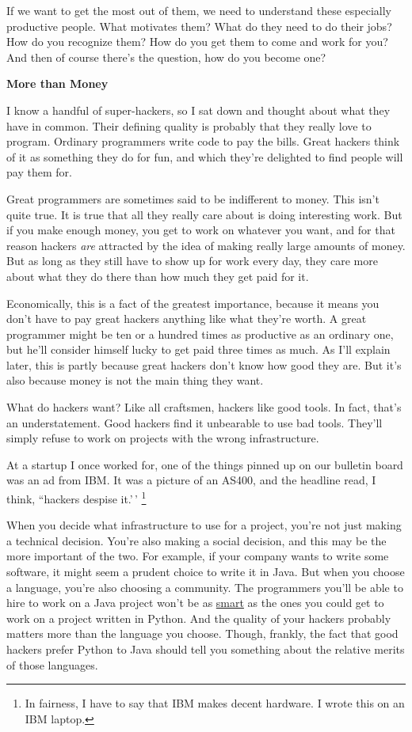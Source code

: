 \documentclass[12pt]{book}
\begin{document}
If we want to get the most out of them, we need to understand these
especially productive people. What motivates them? What do they need to
do their jobs? How do you recognize them? How do you get them to come
and work for you? And then of course there's the question, how do you
become one?

\textbf{More than Money}

I know a handful of super-hackers, so I sat down and thought about what
they have in common. Their defining quality is probably that they really
love to program. Ordinary programmers write code to pay the bills. Great
hackers think of it as something they do for fun, and which they're
delighted to find people will pay them for.

Great programmers are sometimes said to be indifferent to money. This
isn't quite true. It is true that all they really care about is doing
interesting work. But if you make enough money, you get to work on
whatever you want, and for that reason hackers \emph{are} attracted by
the idea of making really large amounts of money. But as long as they
still have to show up for work every day, they care more about what they
do there than how much they get paid for it.

Economically, this is a fact of the greatest importance, because it
means you don't have to pay great hackers anything like what they're
worth. A great programmer might be ten or a hundred times as productive
as an ordinary one, but he'll consider himself lucky to get paid three
times as much. As I'll explain later, this is partly because great
hackers don't know how good they are. But it's also because money is not
the main thing they want.

What do hackers want? Like all craftsmen, hackers like good tools. In
fact, that's an understatement. Good hackers find it unbearable to use
bad tools. They'll simply refuse to work on projects with the wrong
infrastructure.

At a startup I once worked for, one of the things pinned up on our
bulletin board was an ad from IBM. It was a picture of an AS400, and the
headline read, I think, ``hackers despise it.'\,' \footnote{In fairness, I have to say that IBM makes decent hardware. I
wrote this on an IBM laptop.}

When you decide what infrastructure to use for a project, you're not
just making a technical decision. You're also making a social decision,
and this may be the more important of the two. For example, if your
company wants to write some software, it might seem a prudent choice to
write it in Java. But when you choose a language, you're also choosing a
community. The programmers you'll be able to hire to work on a Java
project won't be as \href{pypar.html}{smart} as the ones you could get
to work on a project written in Python. And the quality of your hackers
probably matters more than the language you choose. Though, frankly, the
fact that good hackers prefer Python to Java should tell you something
about the relative merits of those languages.
\end{document}
